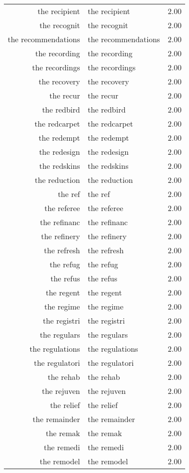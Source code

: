 \begin{table}[ht]
\begin{tabular}{rlr}
  the recipient & the recipient & 2.00 \\ 
  the recognit & the recognit & 2.00 \\ 
  the recommendations & the recommendations & 2.00 \\ 
  the recording & the recording & 2.00 \\ 
  the recordings & the recordings & 2.00 \\ 
  the recovery & the recovery & 2.00 \\ 
  the recur & the recur & 2.00 \\ 
  the redbird & the redbird & 2.00 \\ 
  the redcarpet & the redcarpet & 2.00 \\ 
  the redempt & the redempt & 2.00 \\ 
  the redesign & the redesign & 2.00 \\ 
  the redskins & the redskins & 2.00 \\ 
  the reduction & the reduction & 2.00 \\ 
  the ref & the ref & 2.00 \\ 
  the referee & the referee & 2.00 \\ 
  the refinanc & the refinanc & 2.00 \\ 
  the refinery & the refinery & 2.00 \\ 
  the refresh & the refresh & 2.00 \\ 
  the refug & the refug & 2.00 \\ 
  the refus & the refus & 2.00 \\ 
  the regent & the regent & 2.00 \\ 
  the regime & the regime & 2.00 \\ 
  the registri & the registri & 2.00 \\ 
  the regulars & the regulars & 2.00 \\ 
  the regulations & the regulations & 2.00 \\ 
  the regulatori & the regulatori & 2.00 \\ 
  the rehab & the rehab & 2.00 \\ 
  the rejuven & the rejuven & 2.00 \\ 
  the relief & the relief & 2.00 \\ 
  the remainder & the remainder & 2.00 \\ 
  the remak & the remak & 2.00 \\ 
  the remedi & the remedi & 2.00 \\ 
  the remodel & the remodel & 2.00 \\ 

\end{tabular}
\end{table}
